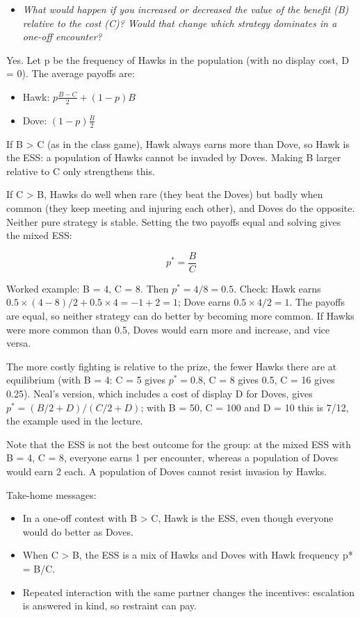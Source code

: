 \documentclass[
  a4paper]{book}
\providecommand{\tightlist}{%
  \setlength{\itemsep}{0pt}\setlength{\parskip}{0pt}}
\begin{document}
\begin{itemize}
\tightlist
\item
  \emph{What would happen if you increased or decreased the value of the benefit (B) relative to the cost (C)? Would that change which strategy dominates in a one-off encounter?}
\end{itemize}

Yes. Let p be the frequency of Hawks in the population (with no display cost, D = 0). The average payoffs are:

\begin{itemize}
\tightlist
\item
  Hawk: \(p\frac{B-C}{2} + (1-p)B\)
\item
  Dove: \((1-p)\frac{B}{2}\)
\end{itemize}

If B \textgreater{} C (as in the class game), Hawk always earns more than Dove, so Hawk is the ESS: a population of Hawks cannot be invaded by Doves. Making B larger relative to C only strengthens this.

If C \textgreater{} B, Hawks do well when rare (they beat the Doves) but badly when common (they keep meeting and injuring each other), and Doves do the opposite. Neither pure strategy is stable. Setting the two payoffs equal and solving gives the mixed ESS:

\[p^* = \frac{B}{C}\]

Worked example: B = 4, C = 8. Then \(p^* = 4/8 = 0.5\). Check: Hawk earns \(0.5 \times (4-8)/2 + 0.5 \times 4 = -1 + 2 = 1\); Dove earns \(0.5 \times 4/2 = 1\). The payoffs are equal, so neither strategy can do better by becoming more common. If Hawks were more common than 0.5, Doves would earn more and increase, and vice versa.

The more costly fighting is relative to the prize, the fewer Hawks there are at equilibrium (with B = 4: C = 5 gives \(p^* = 0.8\), C = 8 gives 0.5, C = 16 gives 0.25). Neal's version, which includes a cost of display D for Doves, gives \(p^* = (B/2 + D)/(C/2 + D)\); with B = 50, C = 100 and D = 10 this is 7/12, the example used in the lecture.

Note that the ESS is not the best outcome for the group: at the mixed ESS with B = 4, C = 8, everyone earns 1 per encounter, whereas a population of Doves would earn 2 each. A population of Doves cannot resist invasion by Hawks.

Take-home messages:

\begin{itemize}
\tightlist
\item
  In a one-off contest with B \textgreater{} C, Hawk is the ESS, even though everyone would do better as Doves.
\item
  When C \textgreater{} B, the ESS is a mix of Hawks and Doves with Hawk frequency p* = B/C.
\item
  Repeated interaction with the same partner changes the incentives: escalation is answered in kind, so restraint can pay.
\end{itemize}
\end{document}
